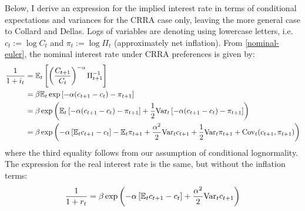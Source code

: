 Below, I derive an expression for the implied interest rate in terms of conditional expectations and variances for the CRRA case only, leaving the more general case to Collard and Dellas. Logs of variables are denoting using lowercase letters, i.e. $c_t := \log C_t$ and $\pi_t := \log \Pi_t$ (approximately net inflation). From \eqref{nominal-euler}, the nominal interest rate under CRRA preferences is given by:
\begin{align}
\label{nominal-euler-crra}
\frac{1}{1 + i_t} &= \mathbb{E}_t \left[  \left( \frac{C_{t+1}}{C_t} \right)^{-\alpha} \Pi_{t+1}^{-1}  \right] \\
  &= \beta \mathbb{E}_t \exp \left[  -\alpha(c_{t+1} - c_t) - \pi_{t+1}  \right] \nonumber \\
  &= \beta \exp \left(  \mathbb{E}_t \left[  -\alpha(c_{t+1} - c_t) - \pi_{t+1}  \right] + \frac{1}{2} \mathrm{Var}_t \left[  -\alpha(c_{t+1} - c_t) - \pi_{t+1}  \right]  \right) \nonumber \\
  &= \beta \exp \left(  -\alpha \left[  \mathbb{E}_t c_{t+1} - c_t  \right] - \mathbb{E}_t \pi_{t+1} + \frac{\alpha^2}{2} \mathrm{Var}_t c_{t+1} + \frac{1}{2} \mathrm{Var}_t \pi_{t+1} + \mathrm{Cov}_t(c_{t+1}, \pi_{t+1})  \right) \nonumber
\end{align}
where the third equality follows from our assumption of conditional lognormality. The expression for the real interest rate is the same, but without the inflation terms: $$\frac{1}{1 + r_t} = \beta \exp \left(  -\alpha \left[  \mathbb{E}_t c_{t+1} - c_t  \right] + \frac{\alpha^2}{2} \mathrm{Var}_t c_{t+1}  \right)$$


